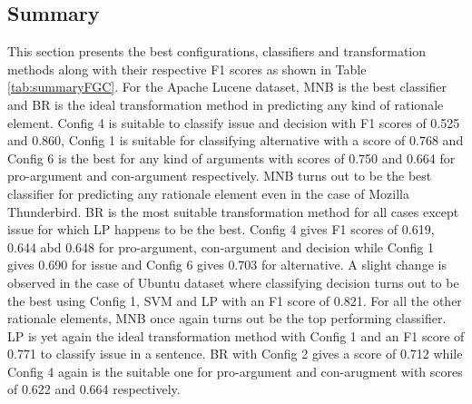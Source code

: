 \documentclass[a4paper,12pt,twoside]{report}
\begin{document}
\subsection{Summary}
This section presents the best configurations, classifiers and transformation methods along with their respective F1 scores as shown in Table \ref{tab:summaryFGC}. For the Apache Lucene dataset, MNB is the best classifier and BR is the ideal transformation method in predicting any kind of rationale element. Config 4 is suitable to classify issue and decision with F1 scores of 0.525 and 0.860, Config 1 is suitable for classifying alternative with a score of 0.768 and Config 6 is the best for any kind of arguments with scores of 0.750 and 0.664 for pro-argument and con-argument respectively. MNB turns out to be the best classifier for predicting any rationale element even in the case of Mozilla Thunderbird. BR is the most suitable transformation method for all cases except issue for which LP happens to be the best. Config 4 gives F1 scores of 0.619, 0.644 abd 0.648 for pro-argument, con-argument and decision while Config 1 gives 0.690 for issue and Config 6 gives 0.703 for alternative. A slight change is observed in the case of Ubuntu dataset where classifying decision turns out to be the best using Config 1, SVM and LP with an F1 score of 0.821. For all the other rationale elements, MNB once again turns out be the top performing classifier. LP is yet again the ideal transformation method with Config 1 and an F1 score of 0.771 to classify issue in a sentence. BR with Config 2 gives a score of 0.712 while Config 4 again is the suitable one for pro-argument and con-arugment with scores of 0.622 and 0.664 respectively. 
\end{document}
